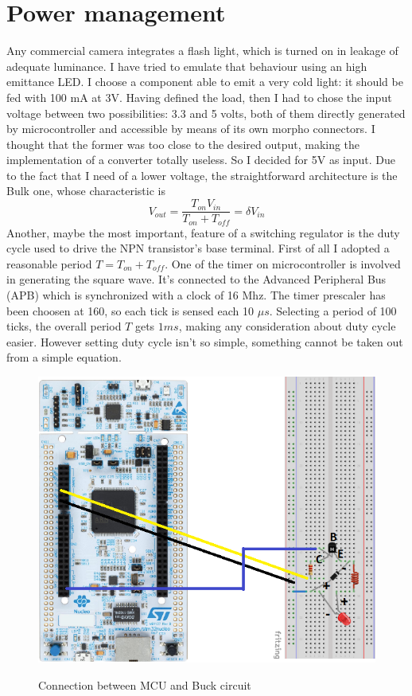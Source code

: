 \section{Power management}
Any commercial camera integrates a flash light, which is turned on in leakage of adequate luminance. I have tried to emulate that behaviour using an high emittance LED. I choose a component able to emit a very cold light: it should be fed with 100 mA at 3V. Having defined the load, then I had to chose the input voltage between two possibilities: 3.3 and 5 volts, both of them directly generated by microcontroller and accessible by means of its own morpho connectors. I thought that the former was too close to the desired output, making the implementation of a converter totally useless. So I decided for 5V as input. Due to the fact that I need of a lower voltage, the straightforward architecture is the Bulk one, whose characteristic is
\begin{equation*}
V_{out} = \dfrac{T_{on}V_{in}}{T_{on}+T_{off}} = \delta V_{in}
\end{equation*}
Another, maybe the most important, feature of a switching regulator is the duty cycle used to drive the NPN transistor's base terminal. First of all I adopted a reasonable period $T = T_{on} + T_{off}$. One of the timer on microcontroller is involved in generating the square wave. It's connected to the Advanced Peripheral Bus (APB) which is synchronized with a clock of 16 Mhz. The timer prescaler has been choosen at 160, so each tick is sensed each 10 $\mu s$. Selecting a period of 100 ticks, the overall period $T$ gets $1 ms$, making any consideration about duty cycle easier. However setting duty cycle isn't so simple, something cannot be taken out from a simple equation.
\begin{figure}[H]
\centering
\includegraphics{Immagini/13}
\label{13}
\caption{Connection between MCU and Buck circuit}
\end{figure}

